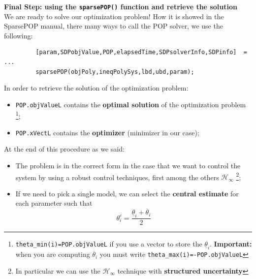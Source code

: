 \noindent
\textbf{Final Step: using the \texttt{sparsePOP()} function and retrieve the solution}\\
We are ready to solve our optimization problem! How it is showed in the SparsePOP manual, there many ways to call the POP solver, we use the following:
{\normalsize{
    \color{blue}
    \begin{verbatim}
         [param,SDPobjValue,POP,elapsedTime,SDPsolverInfo,SDPinfo]  = ... 
         sparsePOP(objPoly,ineqPolySys,lbd,ubd,param); 
    \end{verbatim}
}}
\noindent
In order to retrieve the solution of the optimization problem:
\begin{itemize}
    \itemsep0em
    \item \texttt{POP.objValueL} contains the \textbf{optimal solution} of the optimization problem
    \footnote[5]{\texttt{theta\_min(i)=POP.objValueL} if you use a vector to store the $\underline{\theta}_i$. \textbf{Important: } when you are computing $\overline{\theta}_i$ you must write \texttt{theta\_max(i)=-POP.objValueL}};
    \item \texttt{POP.xVectL} contains the \textbf{optimizer} (minimizer in our case); 
\end{itemize}

\noindent 
At the end of this procedure as we said:
\begin{itemize}
    \item The problem is in the correct form in the case that we want to control the system by using a robust control techniques, first among the others $\mathcal{H}_\infty$
    \footnote[6]{In particular we can use the $\mathcal{H_\infty}$ technique with \textbf{structured uncertainty}}; 
    \item If we need to pick a single model, we can select the \textbf{central estimate} for each parameter such that $$
    \theta_i^c = \frac{\underline{\theta}_i + \overline{\theta}_i}{2}
    $$
\end{itemize}




 







